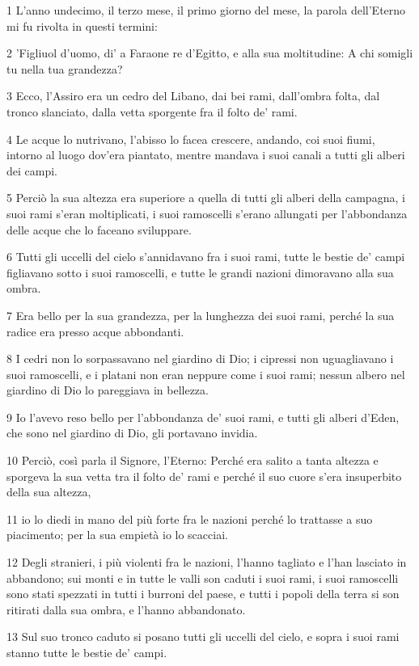 \par 1 L'anno undecimo, il terzo mese, il primo giorno del mese, la parola dell'Eterno mi fu rivolta in questi termini:
\par 2 'Figliuol d'uomo, di' a Faraone re d'Egitto, e alla sua moltitudine: A chi somigli tu nella tua grandezza?
\par 3 Ecco, l'Assiro era un cedro del Libano, dai bei rami, dall'ombra folta, dal tronco slanciato, dalla vetta sporgente fra il folto de' rami.
\par 4 Le acque lo nutrivano, l'abisso lo facea crescere, andando, coi suoi fiumi, intorno al luogo dov'era piantato, mentre mandava i suoi canali a tutti gli alberi dei campi.
\par 5 Perciò la sua altezza era superiore a quella di tutti gli alberi della campagna, i suoi rami s'eran moltiplicati, i suoi ramoscelli s'erano allungati per l'abbondanza delle acque che lo faceano sviluppare.
\par 6 Tutti gli uccelli del cielo s'annidavano fra i suoi rami, tutte le bestie de' campi figliavano sotto i suoi ramoscelli, e tutte le grandi nazioni dimoravano alla sua ombra.
\par 7 Era bello per la sua grandezza, per la lunghezza dei suoi rami, perché la sua radice era presso acque abbondanti.
\par 8 I cedri non lo sorpassavano nel giardino di Dio; i cipressi non uguagliavano i suoi ramoscelli, e i platani non eran neppure come i suoi rami; nessun albero nel giardino di Dio lo pareggiava in bellezza.
\par 9 Io l'avevo reso bello per l'abbondanza de' suoi rami, e tutti gli alberi d'Eden, che sono nel giardino di Dio, gli portavano invidia.
\par 10 Perciò, così parla il Signore, l'Eterno: Perché era salito a tanta altezza e sporgeva la sua vetta tra il folto de' rami e perché il suo cuore s'era insuperbito della sua altezza,
\par 11 io lo diedi in mano del più forte fra le nazioni perché lo trattasse a suo piacimento; per la sua empietà io lo scacciai.
\par 12 Degli stranieri, i più violenti fra le nazioni, l'hanno tagliato e l'han lasciato in abbandono; sui monti e in tutte le valli son caduti i suoi rami, i suoi ramoscelli sono stati spezzati in tutti i burroni del paese, e tutti i popoli della terra si son ritirati dalla sua ombra, e l'hanno abbandonato.
\par 13 Sul suo tronco caduto si posano tutti gli uccelli del cielo, e sopra i suoi rami stanno tutte le bestie de' campi.
